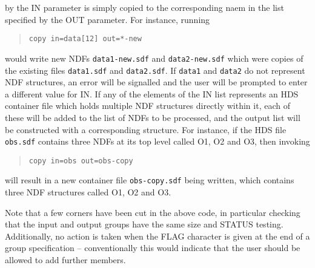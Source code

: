 by the IN parameter is simply copied to the corresponding naem in the 
list specified by the OUT parameter.  For instance, running
\begin{quote}
\latexonly{\small}
\begin{verbatim}
copy in=data[12] out=*-new
\end{verbatim}
\end{quote}
would write new NDFs {\tt data1-new.sdf} and {\tt data2-new.sdf}
which were copies of the existing files {\tt data1.sdf} and {\tt data2.sdf}.
If {\tt data1} and {\tt data2} do not represent NDF structures,
an error will be signalled and the user will be prompted to enter
a different value for IN.
If any of the elements of the IN list represents an HDS container file
which holds multiple NDF structures directly within it, each of these
will be added to the list of NDFs to be processed, and the
output list will be constructed with a corresponding structure.
For instance, if the HDS file {\tt obs.sdf} contains three NDFs at
its top level called O1, O2 and O3, then invoking
\begin{quote}
\latexonly{\small}
\begin{verbatim}
copy in=obs out=obs-copy
\end{verbatim}
\end{quote}
will result in a new container file {\tt obs-copy.sdf} being written, 
which contains three NDF structures called O1, O2 and O3.

Note that a few corners have been cut in the above code,
in particular checking that the input and output groups have the
same size and STATUS testing.  Additionally, no action is taken
when the FLAG character is given at the end of a group specification --
conventionally this would indicate that the user should be allowed
to add further members.

\appendix

\newcommand{\noteroutine}[2]{{\small \bf #1} \\
                              \hspace*{3em} {\em #2} \\[1.5ex]}

\begin{htmlonly}
\renewcommand{\noteroutine}[2]{
\begin{description}
\item [{\bf {#1}}] 
{\em #2}
\end{description}
}


\end{htmlonly}


